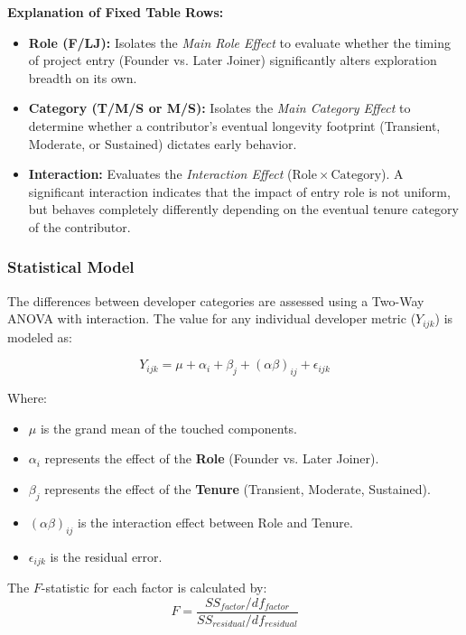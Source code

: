 \textbf{Explanation of Fixed Table Rows:}
\begin{itemize}
    \item \textbf{Role (F/LJ):} Isolates the \textit{Main Role Effect} to evaluate whether the timing of project entry (Founder vs. Later Joiner) significantly alters exploration breadth on its own.
    \item \textbf{Category (T/M/S or M/S):} Isolates the \textit{Main Category Effect} to determine whether a contributor's eventual longevity footprint (Transient, Moderate, or Sustained) dictates early behavior.
    \item \textbf{Interaction:} Evaluates the \textit{Interaction Effect} ($\mathrm{Role} \times \mathrm{Category}$). A significant interaction indicates that the impact of entry role is not uniform, but behaves completely differently depending on the eventual tenure category of the contributor.
\end{itemize}


\subsubsection*{Statistical Model}
The differences between developer categories are assessed using a Two-Way ANOVA 
with interaction. The value for any individual developer metric ($Y_{ijk}$) 
is modeled as:

\begin{equation}
    Y_{ijk} = \mu + \alpha_i + \beta_j + (\alpha\beta)_{ij} + \epsilon_{ijk}
\end{equation}

Where:
\begin{itemize}
    \item $\mu$ is the grand mean of the touched components.
    \item $\alpha_i$ represents the effect of the \textbf{Role} (Founder vs. Later Joiner).
    \item $\beta_j$ represents the effect of the \textbf{Tenure} (Transient, Moderate, Sustained).
    \item $(\alpha\beta)_{ij}$ is the interaction effect between Role and Tenure.
    \item $\epsilon_{ijk}$ is the residual error.
\end{itemize}

The $F$-statistic for each factor is calculated by:
\begin{equation}
    F = \frac{SS_{factor} / df_{factor}}{SS_{residual} / df_{residual}}
\end{equation}

\newpage 
